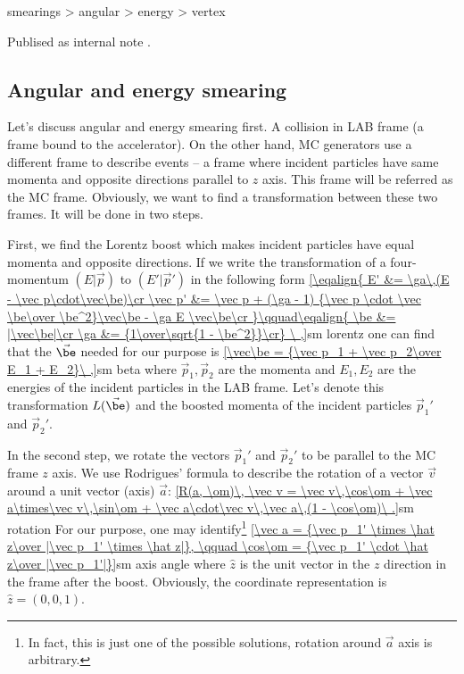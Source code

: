 
\> smearings
\>> angular
\>> energy
\>> vertex

Publised as internal note .


\subsection{Angular and energy smearing}

Let's discuss angular and energy smearing first. A collision in LAB frame (a frame bound to the accelerator). On the other hand, MC generators use a different frame to describe events -- a frame where incident particles have same momenta and opposite directions parallel to $z$ axis. This frame will be referred as the MC frame. Obviously, we want to find a transformation between these two frames. It will be done in two steps. 


First, we find the Lorentz boost which makes incident particles have equal momenta and opposite directions. If we write the transformation of a four-momentum $(E|\vec p)$ to $(E'|\vec p')$ in the following form
\eqref{\eqalign{
E'      &= \ga\,(E - \vec p\cdot\vec\be)\cr
\vec p' &= \vec p  +  (\ga - 1) {\vec p \cdot \vec \be\over \be^2}\vec\be - \ga E \vec\be\cr
}\qquad\eqalign{
\be &= |\vec\be|\cr
\ga &= {1\over\sqrt{1 - \be^2}}\cr}
\ ,}{sm lorentz}
one can find that the $\vec\be$ needed for our purpose is
\eqref{\vec\be = {\vec p_1 + \vec p_2\over E_1 + E_2}\ ,}{sm beta}
where $\vec p_1, \vec p_2$ are the momenta and $E_1, E_2$ are the energies of the incident particles in the LAB frame. Let's denote this transformation $L(\vec\be)$ and the boosted momenta of the incident particles $\vec p_1'$ and $\vec p_2'$.

In the second step, we rotate the vectors $\vec p_1'$ and $\vec p_2'$ to be parallel to the MC frame $z$ axis. We use Rodrigues' formula to describe the rotation of a vector $\vec v$ around a unit vector (axis) $\vec a$:
\eqref{R(a, \om)\, \vec v = \vec v\,\cos\om + \vec a\times\vec v\,\sin\om + \vec a\cdot\vec v\,\vec a\,(1 - \cos\om)\ .}{sm rotation}
For our purpose, one may identify\footnote{In fact, this is just one of the possible solutions, rotation around $\vec a$ axis is arbitrary.}
\eqref{\vec a = {\vec p_1' \times \hat z\over |\vec p_1' \times \hat z|}, \qquad \cos\om = {\vec p_1' \cdot \hat z\over |\vec p_1'|}}{sm axis angle}
where $\hat z$ is the unit vector in the $z$ direction in the frame after the boost. Obviously, the coordinate representation is $\hat z = (0, 0, 1)$.


